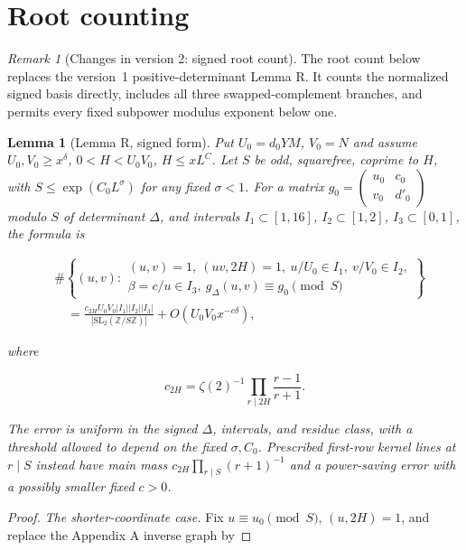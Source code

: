 \documentclass[11pt]{article}
\newtheorem{lemma}[theorem]{Lemma}
\theoremstyle{definition}
\theoremstyle{remark}
\newtheorem{remark}[theorem]{Remark}
\numberwithin{equation}{section}
\begin{document}
\section{Root counting}\label{sec:roots}
\begin{remark}[Changes in version 2: signed root count]
The root count below replaces the version~1 positive-determinant
Lemma R. It counts the normalized signed basis directly, includes
all three swapped-complement branches, and permits every fixed
subpower modulus exponent below one.
\end{remark}
\begin{lemma}[Lemma R, signed form]\label{lem:R}
Put $U_0=d_0YM$, $V_0=N$ and assume $U_0,V_0\ge x^\delta$, $0<H<U_0V_0$, $H\le xL^C$. Let $S$ be odd, squarefree, coprime to $H$, with $S\le\exp(C_0L^\sigma)$ for any fixed $\sigma<1$. For a matrix $g_0=\left(\begin{smallmatrix}u_0&c_0\\v_0&d'_0\end{smallmatrix}\right)$ modulo $S$ of determinant $\Delta$, and intervals $I_1\subset[1,16]$, $I_2\subset[1,2]$, $I_3\subset[0,1]$, the formula is


\begin{equation}\label{v2:4-1}
\begin{aligned}&\#\left\{(u,v):\begin{array}{l}
(u,v)=1,\ (uv,2H)=1,\ u/U_0\in I_1,\ v/V_0\in I_2,\\
\beta=c/u\in I_3,\ g_\Delta(u,v)\equiv g_0\pmod S
\end{array}\right\}\\
&\quad=\frac{c_{2H}U_0V_0|I_1||I_2||I_3|}{|\mathrm{SL}_2(\mathbb Z/S\mathbb Z)|}
+O(U_0V_0x^{-c\delta}),
\end{aligned}
\end{equation}


where


\begin{equation}
c_{2H}=\zeta(2)^{-1}\prod_{r\mid2H}\frac{r-1}{r+1}.
\end{equation}


The error is uniform in the signed $\Delta$, intervals, and residue class, with a threshold allowed to depend on the fixed $\sigma,C_0$. Prescribed first-row kernel lines at $r\mid S$ instead have main mass $c_{2H}\prod_{r\mid S}(r+1)^{-1}$ and a power-saving error with a possibly smaller fixed $c>0$.

\end{lemma}\begin{proof}\emph{The shorter-coordinate case.} Fix $u\equiv u_0\pmod S$, $(u,2H)=1$, and replace the Appendix A inverse graph by



\end{proof}
\end{document}
